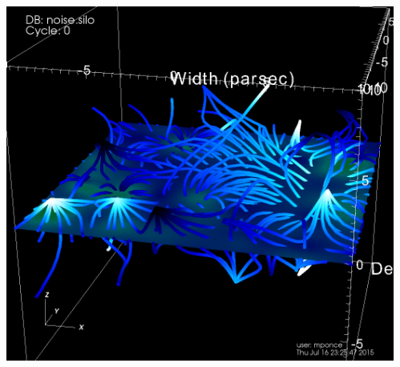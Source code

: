 \begin{frame}
\begin{columns}
\begin{column}{6.5cm}
\begin{beamerboxesrounded}[upper=block head,lower=block body,shadow=true]{}
	\hspace{3.5mm}
	\end{beamerboxesrounded}
\end{column}
\begin{column}{5.5cm}
	\includegraphics[width=\columnwidth]{figs/visit-pract/VisIt_slice01a}
\end{column}
\end{columns}
\end{frame}


